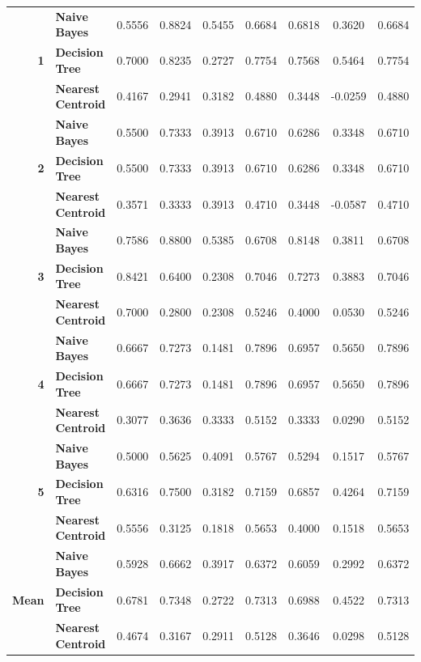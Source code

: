 \begin{center}
\begin{longtable}{ | r  l | c | c | c | c | c | c | c | }
\multirow{3}{*}{\textbf{1}} & \textbf{Naive Bayes} & 
0.5556 & 0.8824 & 0.5455 & 0.6684 & 0.6818 &  0.3620 & 0.6684 \\
& \textbf{Decision Tree} & 
0.7000 & 0.8235 & 0.2727 & 0.7754 & 0.7568 &  0.5464 & 0.7754 \\
& \textbf{Nearest Centroid} &
0.4167 & 0.2941 & 0.3182 & 0.4880 & 0.3448 & -0.0259 & 0.4880 \\
\hline
\multirow{3}{*}{\textbf{2}} & \textbf{Naive Bayes} & 
0.5500 & 0.7333 & 0.3913 & 0.6710 & 0.6286 &  0.3348 & 0.6710 \\
& \textbf{Decision Tree} & 
0.5500 & 0.7333 & 0.3913 & 0.6710 & 0.6286 &  0.3348 & 0.6710 \\
& \textbf{Nearest Centroid} &
0.3571 & 0.3333 & 0.3913 & 0.4710 & 0.3448 & -0.0587 & 0.4710  \\
\hline
\multirow{3}{*}{\textbf{3}} & \textbf{Naive Bayes} & 
0.7586 & 0.8800 & 0.5385 & 0.6708 & 0.8148 & 0.3811 & 0.6708 \\
& \textbf{Decision Tree} & 
0.8421 & 0.6400 & 0.2308 & 0.7046 & 0.7273 & 0.3883 & 0.7046 \\
& \textbf{Nearest Centroid} &
0.7000 & 0.2800 & 0.2308 & 0.5246 & 0.4000 & 0.0530 & 0.5246 \\
\hline
\multirow{3}{*}{\textbf{4}} & \textbf{Naive Bayes} & 
0.6667 & 0.7273 & 0.1481 & 0.7896 & 0.6957 & 0.5650 & 0.7896 \\
& \textbf{Decision Tree} & 
0.6667 & 0.7273 & 0.1481 & 0.7896 & 0.6957 & 0.5650 & 0.7896 \\
& \textbf{Nearest Centroid} &
0.3077 & 0.3636 & 0.3333 & 0.5152 & 0.3333 & 0.0290 & 0.5152 \\
\hline
\multirow{3}{*}{\textbf{5}} & \textbf{Naive Bayes} & 
0.5000 & 0.5625 & 0.4091 & 0.5767 & 0.5294 & 0.1517 & 0.5767 \\
& \textbf{Decision Tree} & 
0.6316 & 0.7500 & 0.3182 & 0.7159 & 0.6857 & 0.4264 & 0.7159 \\
& \textbf{Nearest Centroid} &
0.5556 & 0.3125 & 0.1818 & 0.5653 & 0.4000 & 0.1518 & 0.5653 \\
\hline
\multirow{3}{*}{\textbf{Mean}} & \textbf{Naive Bayes} & 
0.5928 & 0.6662 & 0.3917 & 0.6372 & 0.6059 & 0.2992 & 0.6372 \\
& \textbf{Decision Tree} & 
0.6781 & 0.7348 & 0.2722 & 0.7313 & 0.6988 & 0.4522 & 0.7313 \\
& \textbf{Nearest Centroid} &
0.4674 & 0.3167 & 0.2911 & 0.5128 & 0.3646 & 0.0298 & 0.5128 \\
\hline
\end{longtable}
\end{center}

